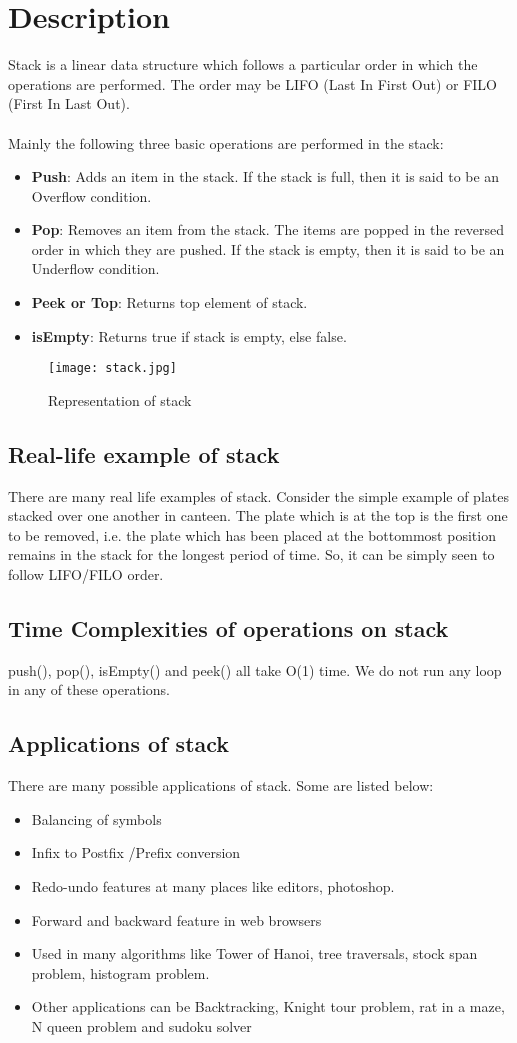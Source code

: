 \documentclass[11pt,fleqn]{book} %
\begin{document}
\section{Description}
Stack is a linear data structure which follows a particular order in which the operations are performed. The order may be LIFO (Last In First Out) or FILO (First In Last Out).\\ ~\\
Mainly the following three basic operations are performed in the stack:
\begin{itemize}
\item \textbf{Push}: Adds an item in the stack. If the stack is full, then it is said to be an Overflow condition.
\item \textbf{Pop}: Removes an item from the stack. The items are popped in the reversed order in which they are pushed. If the stack is empty, then it is said to be an Underflow condition.
\item \textbf{Peek or Top}: Returns top element of stack.
\item \textbf{isEmpty}: Returns true if stack is empty, else false.
\end{itemize}
\begin{figure}[H]
  \centering
  \texttt{[image: stack.jpg]}
  \caption{Representation of stack}
\end{figure}
\newpage
\subsection{Real-life example of stack}
There are many real life examples of stack. Consider the simple example of plates stacked over one another in canteen. The plate which is at the top is the first one to be removed, i.e. the plate which has been placed at the bottommost position remains in the stack for the longest period of time. So, it can be simply seen to follow LIFO/FILO order.
\subsection{Time Complexities of operations on stack}
push(), pop(), isEmpty() and peek() all take O(1) time. We do not run any loop in any of these operations.

\subsection{Applications of stack}
There are many possible applications of stack. Some are listed below:
\begin{itemize}
\item Balancing of symbols
\item Infix to Postfix /Prefix conversion
\item Redo-undo features at many places like editors, photoshop.
\item Forward and backward feature in web browsers
\item Used in many algorithms like Tower of Hanoi, tree traversals, stock span problem, histogram problem.
\item Other applications can be Backtracking, Knight tour problem, rat in a maze, N queen problem and sudoku solver
\end{itemize}
\end{document}
